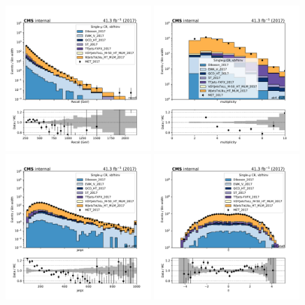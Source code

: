 {\begin{figure}[htbp]
    \begin{center}
        \includegraphics[width=0.49\textwidth]{fig/datamc/cr_1m_vbf/cr_1m_vbf_recoil_losf_2017.pdf}
        \includegraphics[width=0.49\textwidth]{fig/datamc/cr_1m_vbf/cr_1m_vbf_ak4_mult_losf_2017.pdf} \\
        \includegraphics[width=0.49\textwidth]{fig/datamc/cr_1m_vbf/cr_1m_vbf_ak4_pt0_losf_2017.pdf}
        \includegraphics[width=0.49\textwidth]{fig/datamc/cr_1m_vbf/cr_1m_vbf_ak4_eta0_losf_2017.pdf}

\end{center}
\end{figure}}
